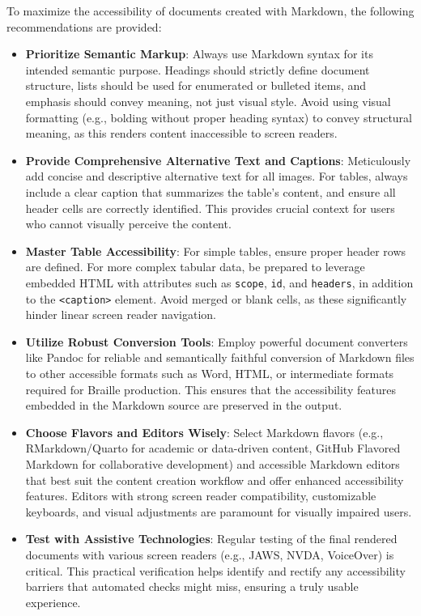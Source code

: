 To maximize the accessibility of documents created with Markdown, the following recommendations are provided:

\begin{itemize}
    \item \textbf{Prioritize Semantic Markup}: Always use Markdown syntax for its intended semantic purpose. Headings should strictly define document structure, lists should be used for enumerated or bulleted items, and emphasis should convey meaning, not just visual style. Avoid using visual formatting (e.g., bolding without proper heading syntax) to convey structural meaning, as this renders content inaccessible to screen readers.
    \item \textbf{Provide Comprehensive Alternative Text and Captions}: Meticulously add concise and descriptive alternative text for all images. For tables, always include a clear caption that summarizes the table's content, and ensure all header cells are correctly identified. This provides crucial context for users who cannot visually perceive the content.
    \item \textbf{Master Table Accessibility}: For simple tables, ensure proper header rows are defined. For more complex tabular data, be prepared to leverage embedded HTML with attributes such as \texttt{scope}, \texttt{id}, and \texttt{headers}, in addition to the \texttt{<caption>} element. Avoid merged or blank cells, as these significantly hinder linear screen reader navigation.
    \item \textbf{Utilize Robust Conversion Tools}: Employ powerful document converters like Pandoc for reliable and semantically faithful conversion of Markdown files to other accessible formats such as Word, HTML, or intermediate formats required for Braille production. This ensures that the accessibility features embedded in the Markdown source are preserved in the output.
    \item \textbf{Choose Flavors and Editors Wisely}: Select Markdown flavors (e.g., RMarkdown/Quarto for academic or data-driven content, GitHub Flavored Markdown for collaborative development) and accessible Markdown editors that best suit the content creation workflow and offer enhanced accessibility features. Editors with strong screen reader compatibility, customizable keyboards, and visual adjustments are paramount for visually impaired users.
    \item \textbf{Test with Assistive Technologies}: Regular testing of the final rendered documents with various screen readers (e.g., JAWS, NVDA, VoiceOver) is critical. This practical verification helps identify and rectify any accessibility barriers that automated checks might miss, ensuring a truly usable experience.

\end{itemize}
